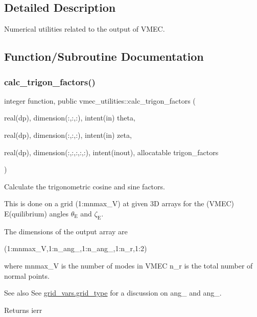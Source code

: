 \subsection{Detailed Description}
Numerical utilities related to the output of V\+M\+EC. 

\subsection{Function/\+Subroutine Documentation}
\mbox{\label{namespacevmec__utilities_ac699116fc25fdea3e28e488513d97c87}} 
\subsubsection{\texorpdfstring{calc\+\_\+trigon\+\_\+factors()}{calc\_trigon\_factors()}}
{\footnotesize\ttfamily integer function, public vmec\+\_\+utilities\+::calc\+\_\+trigon\+\_\+factors (\begin{DoxyParamCaption}\item[{real(dp), dimension(\+:,\+:,\+:), intent(in)}]{theta,  }\item[{real(dp), dimension(\+:,\+:,\+:), intent(in)}]{zeta,  }\item[{real(dp), dimension(\+:,\+:,\+:,\+:,\+:), intent(inout), allocatable}]{trigon\+\_\+factors }\end{DoxyParamCaption})}



Calculate the trigonometric cosine and sine factors. 

This is done on a grid {\ttfamily (1\+:mnmax\+\_\+V)} at given 3D arrays for the (V\+M\+EC) E(quilibrium) angles $\theta_\text{E}$ and $\zeta_\text{E}$.

The dimensions of the output array are

{\ttfamily (1\+:mnmax\+\_\+V,1\+:n\+\_\+ang\+\_,1\+:n\+\_\+ang\+\_,1\+:n\+\_\+r,1\+:2)}

where {\ttfamily mnmax\+\_\+V} is the number of modes in V\+M\+EC {\ttfamily n\+\_\+r} is the total number of normal points.

\begin{DoxySeeAlso}{See also}
See \hyperlink{structgrid__vars_1_1grid__type}{grid\+\_\+vars.\+grid\+\_\+type} for a discussion on {\ttfamily ang\+\_} and {\ttfamily ang\+\_}.
\end{DoxySeeAlso}
\begin{DoxyReturn}{Returns}
ierr
\end{DoxyReturn}

